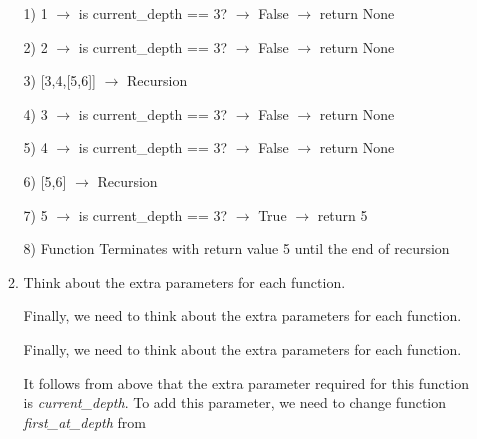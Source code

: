 \documentclass[12pt]{article}
\begin{document}
\begin{enumerate}[a.]
\begin{mdframed}
\begin{enumerate}[1.]
\begin{mdframed}
            \begin{mdframed}

                1) 1 $\to$ is current\_depth == 3? $\to$ False $\to$ return None

                2) 2 $\to$ is current\_depth == 3? $\to$ False $\to$ return None

                3) [3,4,[5,6]] $\to$ Recursion

                \bigskip

                \hspace{10mm} 4) 3 $\to$ is current\_depth == 3? $\to$ False $\to$ return None

                \hspace{10mm} 5) 4 $\to$ is current\_depth == 3? $\to$ False $\to$ return None

                \hspace{10mm} 6) [5,6] $\to$ Recursion

                \bigskip

                \hspace{10mm} \hspace{10mm} 7) 5 $\to$ is current\_depth == 3? $\to$ True $\to$ return 5

                \bigskip

                8) Function Terminates with return value 5 until the end of recursion

            \end{mdframed}
            \end{mdframed}

            \item Think about the extra parameters for each function.

            \bigskip

            Finally, we need to think about the extra parameters for each function.

            \bigskip

            \begin{mdframed}

            Finally, we need to think about the extra parameters for each function.

            \bigskip

            It follows from above that the extra parameter required for this function is
            \textit{current\_depth}. To add this parameter, we need to change function
            \textit{first\_at\_depth} from


\end{mdframed}
\end{enumerate}
\end{mdframed}
\end{enumerate}
\end{document}
